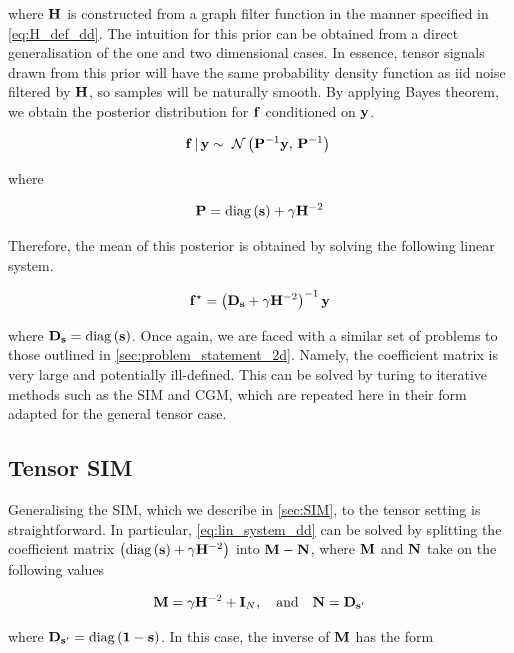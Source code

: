 where $\mathbf{H}$ is constructed from a graph filter function in the manner specified in \cref{eq:H_def_dd}. The intuition for this prior can be obtained from a direct generalisation of the one and two dimensional cases. In essence, tensor signals drawn from this prior will have the same probability density function as iid noise filtered by $\mathbf{H}$, so samples will be naturally smooth. By applying Bayes theorem, we obtain the posterior distribution for $\mathbf{f}$ conditioned on $\mathbf{y}$. 


\begin{equation}
    \mathbf{f} \, | \, \mathbf{y} \sim \; \mathcal{N}\left(\mathbf{P}^{-1} \mathbf{y}, \, \mathbf{P}^{-1}\right) \;
\end{equation}

where 

\begin{equation}
    \mathbf{P} = \text{\textup{diag}}\left(\mathbf{s}\right) + \gamma \mathbf{H}^{-2}
\end{equation}

Therefore, the mean of this posterior is obtained by solving the following linear system.

\begin{equation}
    \label{eq:lin_system_dd}
    \mathbf{f}^{\star} = \left(\mathbf{D}_{\mathbf{s}} + \gamma \mathbf{H}^{-2}\right)^{-1} \mathbf{y}
\end{equation}

where $\mathbf{D}_{\mathbf{s}} = \text{\textup{diag}}\left(\mathbf{s}\right)$. Once again, we are faced with a similar set of problems to those outlined in \cref{sec:problem_statement_2d}. Namely, the coefficient matrix is very large and potentially ill-defined. This can be solved by turing to iterative methods such as the SIM and CGM, which are repeated here in their form adapted for the general tensor case. 

\subsection{Tensor SIM}

Generalising the SIM, which we describe in \cref{sec:SIM}, to the tensor setting is straightforward. In particular, \cref{eq:lin_system_dd} can be solved by splitting the coefficient matrix $\left(\text{\textup{diag}}\left(\mathbf{s}\right) + \gamma \mathbf{H}^{-2}\right)$ into $\mathbf{M} - \mathbf{N}$, where $\mathbf{M}$ and $\mathbf{N}$ take on the following values
 
\begin{equation}
    \mathbf{M} = \gamma \mathbf{H}^{-2} + \mathbf{I}_N, \quad \text{and} \quad \mathbf{N} = \mathbf{D}_{\mathbf{s}'}
\end{equation}

where $\mathbf{D}_{\mathbf{s}'} = \text{\textup{diag}}\left(\mathbf{1} - \mathbf{s}\right)$. In this case, the inverse of $\mathbf{M}$ has the form 


